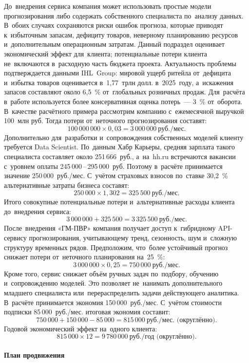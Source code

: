До~внедрения сервиса компания может использовать простые модели
прогнозирования либо содержать собственного специалиста по~анализу данных.
В~обоих случаях сохраняются риски ошибок прогноза, которые приводят
к~избыточным запасам, дефициту товаров, неверному планированию ресурсов
и~дополнительным операционным затратам. Данный подраздел оценивает
экономический эффект для~клиента; потенциальные потери клиента не~включаются
в~расходную часть бюджета проекта.
Актуальность проблемы подтверждается данными IHL~Group: мировой ущерб ритейла
от~дефицита и~избытка товаров оценивается в~1,77~трлн долл. в~2025~году,
а~искажения запасов составляют около 6,5~\% от~глобальных розничных продаж.
Для~расчёта в~работе используется более консервативная оценка потерь~---
3~\% от~оборота. В~качестве расчётного примера рассмотрим компанию
с~ежемесячной выручкой 100~млн руб. Тогда потери от~неточного прогнозирования
составят:
\[ 100\,000\,000 \times 0{,}03 = 3\,000\,000~\text{руб./мес.} \]
Дополнительно для~разработки и~сопровождения собственных моделей клиенту
требуется Data Scientist. По~данным Хабр Карьеры, средняя зарплата такого
специалиста составляет около 251\,666~руб., а~на~hh.ru встречаются вакансии
с~уровнем оплаты 245\,000\,--\,295\,000~руб. Поэтому в~расчёте принимается
значение 250\,000~руб./мес. С~учётом страховых взносов по~ставке 30,2~\%
альтернативные затраты бизнеса составят:
\[ 250\,000 \times 1{,}302 = 325\,500~\text{руб./мес.} \]
Итого совокупные потенциальные потери и~альтернативные расходы клиента
до~внедрения сервиса:
\[ 3\,000\,000 + 325\,500 = 3\,325\,500~\text{руб./мес.} \]
После~внедрения «ГМ-ПВР» компания получает доступ к~гибридному API-сервису
прогнозирования, учитывающему тренд, сезонность, шум и~сложную структуру
временных рядов. Предположим, что~более устойчивый прогноз снижает потери
от~неточного планирования на~25~\%:
\[ 3\,000\,000 \times 0{,}25 = 750\,000~\text{руб./мес.} \]
Кроме того, сервис снижает объём ручных задач по~подбору, обучению
и~сопровождению моделей. Это позволяет не~нанимать дополнительного младшего
специалиста или~перераспределить задачи действующего аналитика. В~расчёте
принимается экономия 150\,000~руб./мес. С~учётом стоимости подписки
85\,000~руб./мес. итоговая экономия составит:
\[ 750\,000 + 150\,000 - 85\,000 = 815\,000~\text{руб./мес. (округлённо).} \]
Годовой экономический эффект на~одного клиента:
\[ 815\,000 \times 12 = 9\,780\,000~\text{руб./год (округлённо).} \]

\paragraph{План продвижения}

